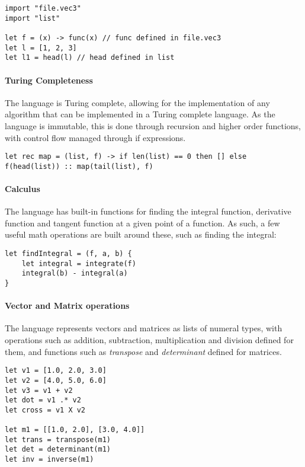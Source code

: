 \begin{verbatim}
import "file.vec3"
import "list"

let f = (x) -> func(x) // func defined in file.vec3
let l = [1, 2, 3]
let l1 = head(l) // head defined in list
\end{verbatim}

\paragraph{Turing Completeness} The language is Turing complete, allowing for the implementation of any
algorithm that can be implemented in a Turing complete language.
As the language is immutable, this is done through recursion and higher order functions, with control flow
managed through if expressions.

\begin{verbatim}
let rec map = (list, f) -> if len(list) == 0 then [] else f(head(list)) :: map(tail(list), f)
\end{verbatim}

\paragraph{Calculus} The language has built-in functions for finding the integral function, derivative function
and tangent function at a given point of a function.
As such, a few useful math operations are built around these, such as finding the integral:

\begin{verbatim}
let findIntegral = (f, a, b) {
    let integral = integrate(f)
    integral(b) - integral(a)
}
\end{verbatim}

\paragraph{Vector and Matrix operations} The language represents vectors and matrices as lists of numeral types, with
operations such as addition, subtraction, multiplication and division defined for them, and functions such as \textit{transpose} and \textit{determinant} defined for matrices.

\begin{verbatim}
let v1 = [1.0, 2.0, 3.0]
let v2 = [4.0, 5.0, 6.0]
let v3 = v1 + v2
let dot = v1 .* v2
let cross = v1 X v2

let m1 = [[1.0, 2.0], [3.0, 4.0]]
let trans = transpose(m1)
let det = determinant(m1)
let inv = inverse(m1)
\end{verbatim}

